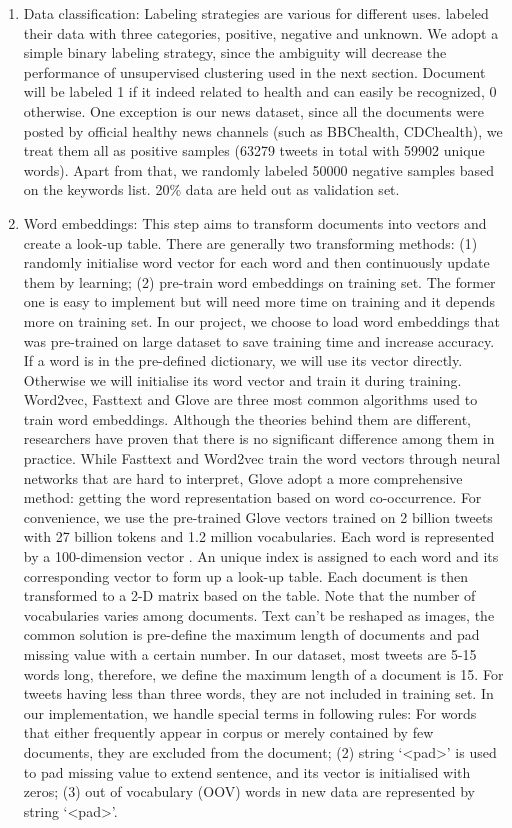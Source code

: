 \begin{enumerate}
    \item Data classification: Labeling strategies are various for different uses. \cite{lampos2010flu} labeled their data with three categories, positive, negative and unknown. We adopt a simple binary labeling strategy, since the ambiguity will decrease the performance of unsupervised clustering used in the next section. Document will be labeled 1 if it indeed related to health and can easily be recognized, 0 otherwise. One exception is our news dataset, since all the documents were posted by official healthy news channels (such as BBChealth, CDChealth), we treat them all as positive samples (63279 tweets in total with 59902 unique words). Apart from that, we randomly labeled 50000 negative samples based on the keywords list. 20\% data are held out as validation set.
    \item Word embeddings: This step aims to transform documents into vectors and create a look-up table. There are generally two transforming methods: (1) randomly initialise word vector for each word and then continuously update them by learning; (2) pre-train word embeddings on training set. The former one is easy to implement but will need more time on training and it depends more on training set. In our project, we choose to load word embeddings that was pre-trained on large dataset to save training time and increase accuracy. If a word is in the pre-defined dictionary, we will use its vector directly. Otherwise we will initialise its word vector and train it during training. Word2vec\cite{mikolov2013efficient}, Fasttext\cite{joulin2016bag} and Glove \cite{pennington2014glove} are three most common algorithms used to train word embeddings. Although the theories behind them are different, researchers have proven that there is no significant difference among them in practice. While Fasttext and Word2vec train the word vectors through neural networks that are hard to interpret, Glove adopt a more comprehensive method: getting the word representation based on word co-occurrence. For convenience, we use the pre-trained Glove vectors trained on 2 billion tweets with 27 billion tokens and 1.2 million vocabularies. Each word is represented by a 100-dimension vector \cite{pennington2014glove}. An unique index is assigned to each word and its corresponding vector to form up a look-up table. Each document is then transformed to a 2-D matrix based on the table. Note that the number of vocabularies varies among documents. Text can't be reshaped as images, the common solution is pre-define the maximum length of documents and pad missing value with a certain number. In our dataset, most tweets are 5-15 words long, therefore, we define the maximum length of a document is 15. For tweets having less than three words, they are not included in training set. In our implementation, we handle special terms in following rules: For words that either frequently appear in corpus or merely contained by few documents, they are excluded from the document; (2) string `<pad>' is used to pad missing value to extend sentence, and its vector is initialised with zeros; (3) out of vocabulary (OOV) words in new data are represented by string `<pad>'.

\end{enumerate}
